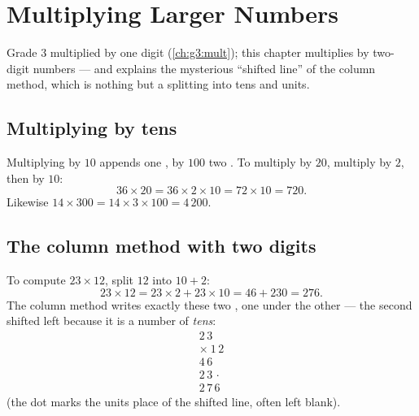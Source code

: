 \chapter{Multiplying Larger Numbers}\label{ch:g4:mult}

Grade 3 multiplied by one digit (\cref{ch:g3:mult}); this chapter
multiplies by two-digit numbers --- and explains the mysterious
``shifted line'' of the column method, which is nothing but a
splitting into tens and units.

\section{Multiplying by tens}

\begin{proposition}\label{prop:g4:mult:tens}
Multiplying by $10$ appends one , by $100$ two . To multiply
by $20$, multiply by $2$, then by $10$:
\[
36 \times 20 = 36 \times 2 \times 10 = 72 \times 10 = 720 .
\]
Likewise $14 \times 300 = 14 \times 3 \times 100 = 4\,200$.
\end{proposition}
\admitted

\section{The column method with two digits}

\begin{example}\label{ex:g4:mult:why}
To compute $23 \times 12$, split $12$ into $10 + 2$:
\[
23 \times 12 = 23 \times 2 + 23 \times 10 = 46 + 230 = 276 .
\]
The column method writes exactly these two , one under the
other --- the second shifted left because it is a number of
\emph{tens}:
\[
\begin{array}{r}
2\,3 \\
\times\ 1\,2 \\
\hline
4\,6 \\
2\,3\,\cdot \\
\hline
2\,7\,6
\end{array}
\]
(the dot marks the units place of the shifted line, often left
blank).
\end{example}

